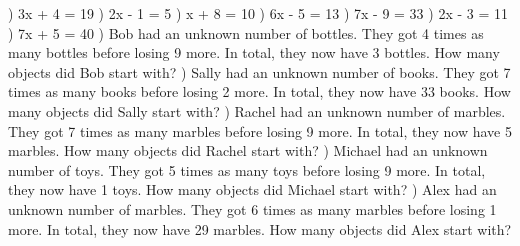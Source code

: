 \documentclass{article}%
\begin{document}
\newline%
) 3x + 4 = 19%
\newline%
\newline%
) 2x - 1 = 5%
\newline%
\newline%
) x + 8 = 10%
\newline%
\newline%
) 6x - 5 = 13%
\newline%
\newline%
) 7x - 9 = 33%
\newline%
\newline%
) 2x - 3 = 11%
\newline%
\newline%
) 7x + 5 = 40%
\newline%
\newline%
) Bob had an unknown number of bottles. They got 4 times as many bottles before losing 9 more. In total, they now have 3 bottles. How many objects did Bob start with?%
\newline%
\newline%
) Sally had an unknown number of books. They got 7 times as many books before losing 2 more. In total, they now have 33 books. How many objects did Sally start with?%
\newline%
\newline%
) Rachel had an unknown number of marbles. They got 7 times as many marbles before losing 9 more. In total, they now have 5 marbles. How many objects did Rachel start with?%
\newline%
\newline%
) Michael had an unknown number of toys. They got 5 times as many toys before losing 9 more. In total, they now have 1 toys. How many objects did Michael start with?%
\newline%
\newline%
) Alex had an unknown number of marbles. They got 6 times as many marbles before losing 1 more. In total, they now have 29 marbles. How many objects did Alex start with?%
\end{document}
